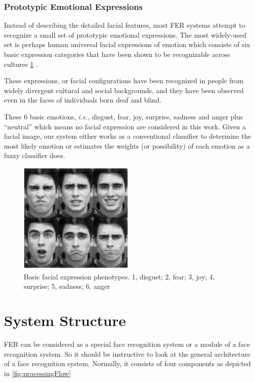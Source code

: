 \documentclass[12pt]{report}
\begin{document}
\subsubsection*{Prototypic Emotional Expressions}
Instead of describing the detailed facial features, most FER systems attempt to recognize a small set of prototypic emotional expressions. The most widely-used set is perhaps human universal facial expressions of emotion which consists of six basic expression categories that have been shown to be recognizable across cultures \ref{fig:facialPhenotypes} .

These expressions, or facial configurations have been recognized in people from widely divergent cultural and social backgrounds, and they have been observed even in the faces of individuals born deaf and blind.

These 6 basic emotions, \textit{i.e.}, disgust, fear, joy, surprise, sadness and anger plus ``neutral'' which means no facial expression are considered in this work. Given a facial image, our system either works as a conventional classifier to determine the most likely emotion or estimates the weights (or possibility) of each emotion as a fuzzy classifier does.

\begin{figure}[h]
    \centering
    \includegraphics[width=0.5\textwidth]{img/facialPhenotypes.png}
    \caption{Basic facial expression phenotypes. 1, disgust; 2, fear; 3, joy; 4, surprise; 5, sadness; 6, anger}
    \label{fig:facialPhenotypes}
\end{figure}

\section{System Structure}
FER can be considered as a special face recognition system or a module of a face recognition system. So it should be instructive to look at the general architecture of a face recognition system. Normally, it consists of four components as depicted in \ref{fig:processingFlow}
\end{document}

